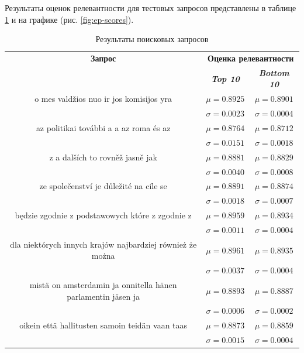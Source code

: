 Результаты оценок релевантности для тестовых запросов представлены в таблице \ref{tab8} и на графике (рис. \ref{fig:ep-scores}).

\begin{table}[tbp]
    \caption{Результаты поисковых запросов}
    \begin{center}
    \begin{tabular}{ccc}
    \toprule
    \textbf{Запрос}&\multicolumn{2}{c}{\textbf{Оценка релевантности}} \\
    & \textbf{\textit{Top 10}}& \textbf{\textit{Bottom 10}} \\
    \midrule
    o mes   valdžios nuo ir  jos komisijos yra& \(\mu=0.8925\) & \(\mu=0.8901\) \\
    & \(\sigma=0.0023\) & \(\sigma=0.0004\) \\
    \midrule
    az politikai további a  a az roma és az& \(\mu=0.8764\) & \(\mu=0.8712\) \\
    & \(\sigma=0.0151\) & \(\sigma=0.0018\) \\
    \midrule
    z a dalších  to rovněž jasně   jak& \(\mu=0.8881\) & \(\mu=0.8829\) \\
    & \(\sigma=0.0040\) & \(\sigma=0.0008\) \\
    \midrule
    ze společenství  je důležité na cíle  se& \(\mu=0.8891\) & \(\mu=0.8874\) \\
    & \(\sigma=0.0018\) & \(\sigma=0.0007\) \\
    \midrule
    będzie zgodnie z podstawowych  które z zgodnie z & \(\mu=0.8959\) & \(\mu=0.8934\) \\
    & \(\sigma=0.0011\) & \(\sigma=0.0004\) \\
    \midrule
    dla niektórych innych krajów najbardziej  również  że można & \(\mu=0.8961\) & \(\mu=0.8935\) \\
    & \(\sigma=0.0037\) & \(\sigma=0.0004\) \\
    \midrule
    mistä on amsterdamin ja onnitella hänen parlamentin jäsen ja & \(\mu=0.8893\) & \(\mu=0.8887\) \\
    & \(\sigma=0.0006\) & \(\sigma=0.0002\) \\
    \midrule
    oikein  että hallitusten samoin   teidän  vaan taas & \(\mu=0.8873\) & \(\mu=0.8859\) \\
    & \(\sigma=0.0015\) & \(\sigma=0.0004\) \\
    \bottomrule
    \end{tabular}\label{tab8}
    \end{center}
\end{table}

